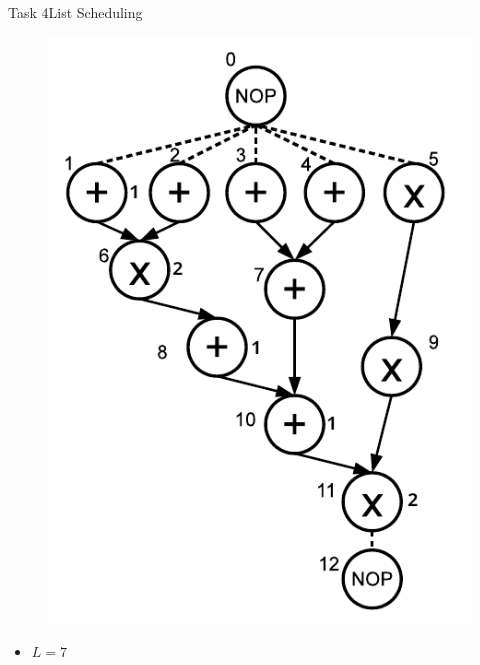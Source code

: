 \begin{frame}[allowframebreaks]{Task 4}{List Scheduling}
  \begin{solutionnoinc}
    \begin{figure}
      \centering
      \includegraphics[height=0.6\paperheight]{./figures/task4_sequence_graph_edit.png}
    \end{figure}
  \end{solutionnoinc}
  \begin{solution}
    \begin{itemize}
      \item $L=7$
    \end{itemize}
  \end{solution}
\end{frame}
